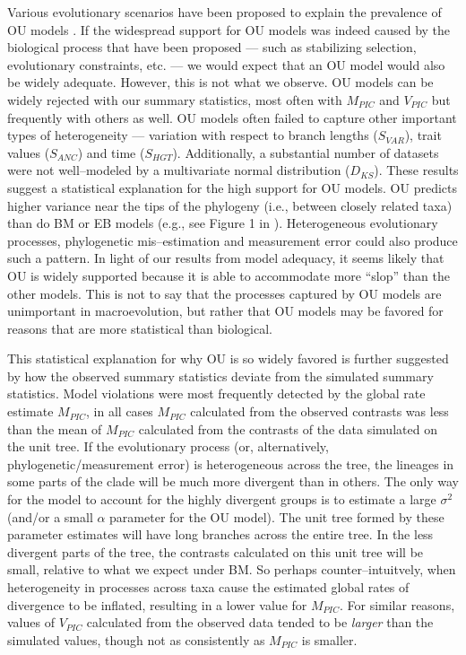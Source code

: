 \documentclass[a4paper,12pt]{article}
\begin{document}
Various evolutionary scenarios have been proposed to explain the prevalence of OU models \citep{HansenMartins1996, ButlerKing2004, Hansen2012book, PennellHarmon}. If the widespread support for OU models was indeed caused by the biological process that have been proposed --- such as stabilizing selection, evolutionary constraints, etc. --- we would expect that an OU model would also be widely adequate. However, this is not what we observe. OU models can be widely rejected with our summary statistics, most often with $M_{PIC}$ and $V_{PIC}$ but frequently with others as well. OU models often failed to capture other important types of heterogeneity --- variation with respect to branch lengths ($S_{VAR}$), trait values ($S_{ANC}$) and time ($S_{HGT}$). Additionally, a substantial number of datasets were not well--modeled by a multivariate normal distribution ($D_{KS}$). These results suggest a statistical explanation for the high support for OU models. OU predicts higher variance near the tips of the phylogeny (i.e., between closely related taxa) than do BM or EB models (e.g., see Figure 1 in \citep{Harmon2010}). Heterogeneous evolutionary processes, phylogenetic mis--estimation and measurement error \citep{Houle2011, Hansen2012} could also produce such a pattern. In light of our results from model adequacy, it seems likely that OU is widely supported because it is able to accommodate more ``slop'' than the other models.  This is not to say that the processes captured by OU models are unimportant in macroevolution, but rather that OU models may be favored for reasons that are more statistical than biological.

This statistical explanation for why OU is so widely favored is further suggested by how the observed summary statistics deviate from the simulated summary statistics. Model violations were most frequently detected by the global rate estimate $M_{PIC}$, in all cases $M_{PIC}$ calculated from the observed contrasts was less than the mean of $M_{PIC}$ calculated from the contrasts of the data simulated on the unit tree. If the evolutionary process (or, alternatively, phylogenetic/measurement error) is heterogeneous across the tree, the lineages in some parts of the clade will be much more divergent than in others. The only way for the model to account for the highly divergent groups is to estimate a large $\sigma^2$ (and/or a small $\alpha$ parameter for the OU model). The unit tree formed by these parameter estimates will have long branches across the entire tree. In the less divergent parts of the tree, the contrasts calculated on this unit tree will be small, relative to what we expect under BM. So perhaps counter--intuitvely, when heterogeneity in processes across taxa cause the estimated global rates of divergence to be inflated, resulting in a lower value for $M_{PIC}$. For similar reasons, values of $V_{PIC}$ calculated from the observed data tended to be \emph{larger} than the simulated values, though not as consistently as $M_{PIC}$ is smaller. 
\end{document}
